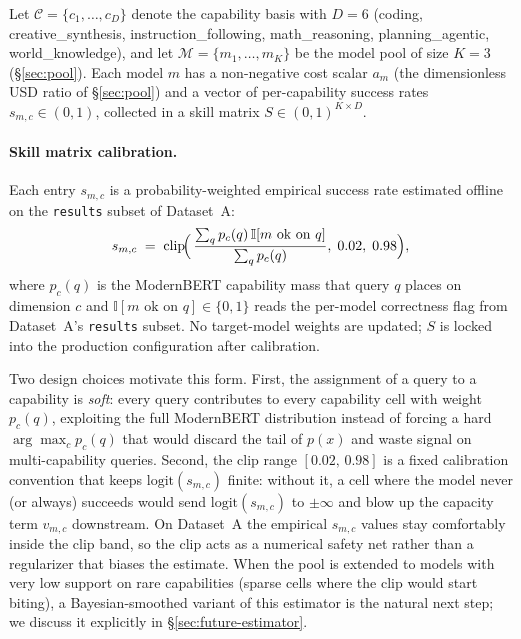 \documentclass[twocolumn,10pt,a4paper]{article}
\begin{document}
Let $\mathcal{C}{=}\{c_1,\dots,c_D\}$ denote the capability basis with $D{=}6$ (coding, creative\_synthesis, instruction\_following, math\_reasoning, planning\_agentic, world\_knowledge), and let $\mathcal{M}{=}\{m_1,\dots,m_K\}$ be the model pool of size $K{=}3$ (§\ref{sec:pool}). Each model $m$ has a non-negative cost scalar $a_m$ (the dimensionless USD ratio of §\ref{sec:pool}) and a vector of per-capability success rates $s_{m,c}\in(0,1)$, collected in a skill matrix $S\in(0,1)^{K\times D}$.

\paragraph{Skill matrix calibration.} Each entry $s_{m,c}$ is a probability-weighted empirical success rate estimated offline on the \texttt{results} subset of Dataset~A:
\[
  s_{m,c} \;=\; \mathrm{clip}\!\Bigl(\,\frac{\sum_q p_c(q)\,\mathbb{I}[m\text{ ok on }q]}{\sum_q p_c(q)},\;0.02,\;0.98\Bigr),
\]
where $p_c(q)$ is the ModernBERT capability mass that query $q$ places on dimension $c$ and $\mathbb{I}[m\text{ ok on }q]\in\{0,1\}$ reads the per-model correctness flag from Dataset~A's \texttt{results} subset. No target-model weights are updated; $S$ is locked into the production configuration after calibration.

Two design choices motivate this form. First, the assignment of a query to a capability is \emph{soft}: every query contributes to every capability cell with weight $p_c(q)$, exploiting the full ModernBERT distribution instead of forcing a hard $\arg\max_c p_c(q)$ that would discard the tail of $p(x)$ and waste signal on multi-capability queries. Second, the clip range $[0.02,\,0.98]$ is a fixed calibration convention that keeps $\mathrm{logit}(s_{m,c})$ finite: without it, a cell where the model never (or always) succeeds would send $\mathrm{logit}(s_{m,c})$ to $\pm\infty$ and blow up the capacity term $v_{m,c}$ downstream. On Dataset~A the empirical $s_{m,c}$ values stay comfortably inside the clip band, so the clip acts as a numerical safety net rather than a regularizer that biases the estimate. When the pool is extended to models with very low support on rare capabilities (sparse cells where the clip would start biting), a Bayesian-smoothed variant of this estimator is the natural next step; we discuss it explicitly in §\ref{sec:future-estimator}.
\end{document}
